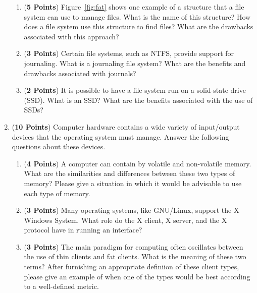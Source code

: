 \documentclass[12pt,epsf,psfig,graphics]{article}
\begin{document}
\begin{enumerate}
\begin{enumerate}

  \item ({\bf 5 Points}) Figure~\ref{fig:fat} shows one example of a structure that a file system can use to manage
    files.  What is the name of this structure? How does a file system use this structure to find files?  What are the
    drawbacks associated with this approach?

  \item ({\bf 3 Points}) Certain file systems, such as NTFS, provide support for journaling.  What is a
    journaling file system?  What are the benefits and drawbacks associated with journals?

  \item ({\bf 2 Points}) It is possible to have a file system run on a solid-state drive (SSD).  What is an SSD?  What
    are the benefits associated with the use of SSDs? 

\end{enumerate}

\newpage

\item ({\bf 10 Points}) Computer hardware contains a wide variety of input/output devices that the operating system must
  manage.  Answer the following questions about these devices.

  \begin{enumerate}

    \item ({\bf 4 Points}) A computer can contain by volatile and non-volatile memory.  What are the similarities and
      differences between these two types of memory?  Please give a situation in which it would be advisable to use each
      type of memory.

    \item ({\bf 3 Points}) Many operating systems, like GNU/Linux, support the X Windows System.  What role do the X
      client, X server, and the X protocol have in running an interface?

    \item ({\bf 3 Points}) The main paradigm for computing often oscillates between the use of thin clients and fat
      clients.  What is the meaning of these two terms?  After furnishing an appropriate definiion of these client
      types, please give an example of when one of the types would be best according to a well-defined metric.

  \end{enumerate}


\end{enumerate}
\end{document}
